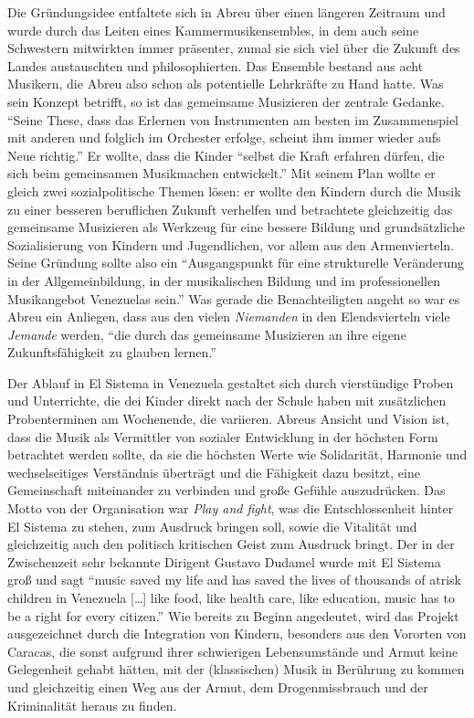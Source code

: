 Die Gründungsidee entfaltete sich in Abreu über einen längeren
Zeitraum und wurde durch das Leiten eines Kammermusikensembles, in dem auch
seine Schwestern mitwirkten immer präsenter, zumal sie sich viel über die
Zukunft des Landes austauschten und philosophierten. Das Ensemble bestand aus
acht Musikern, die Abreu also schon als potentielle Lehrkräfte zu Hand hatte.
\autocite[34]{kaufmann:el_sistema} Was sein Konzept betrifft, so ist das
gemeinsame Musizieren der zentrale Gedanke. \enquote{Seine These, dass das
Erlernen von Instrumenten am besten im Zusammenspiel mit anderen und folglich im
Orchester erfolge, scheint ihm immer wieder aufs Neue
richtig.}\autocite[34]{kaufmann:el_sistema} Er wollte, dass die Kinder
\enquote{selbst die Kraft erfahren dürfen, die sich beim gemeinsamen Musikmachen
entwickelt.}\autocite[34]{kaufmann:el_sistema} Mit seinem Plan wollte er gleich
zwei sozialpolitische Themen lösen: er wollte den Kindern durch die Musik zu
einer besseren beruflichen Zukunft verhelfen und betrachtete gleichzeitig das
gemeinsame Musizieren als Werkzeug für eine bessere Bildung und grundsätzliche
Sozialisierung von Kindern und Jugendlichen, vor allem aus den Armenvierteln.
Seine Gründung sollte also ein \enquote{Ausgangspunkt für eine strukturelle
Veränderung in der Allgemeinbildung, in der musikalischen Bildung und im
professionellen Musikangebot Venezuelas sein.}\autocite[38]{kaufmann:el_sistema}
Was gerade die Benachteiligten angeht so war es Abreu ein Anliegen, dass aus den
vielen \emph{Niemanden} in den Elendsvierteln viele \emph{Jemande} werden, \enquote{die durch
das gemeinsame Musizieren an ihre eigene Zukunftsfähigkeit zu glauben
lernen.}\autocite[39]{kaufmann:el_sistema}

Der Ablauf in El Sistema in Venezuela gestaltet sich durch vierstündige Proben
und Unterrichte, die dei Kinder direkt nach der Schule haben mit zusätzlichen
Probenterminen am Wochenende, die variieren. Abreus Ansicht und Vision ist, dass
die Musik als Vermittler von sozialer Entwicklung in der höchsten Form
betrachtet werden sollte, da sie die höchsten Werte wie Solidarität, Harmonie
und wechselseitiges Verständnis überträgt und die Fähigkeit dazu besitzt, eine
Gemeinschaft miteinander zu verbinden und große Gefühle auszudrücken. Das Motto
von der Organisation war \emph{Play and fight}, was die Entschlossenheit hinter
El Sistema zu stehen, zum Ausdruck bringen soll, sowie die Vitalität und
gleichzeitig auch den politisch kritischen Geist zum Ausdruck bringt. Der in der
Zwischenzeit sehr bekannte Dirigent Gustavo Dudamel wurde mit El Sistema groß
und sagt \enquote{music saved my life and has saved the lives of thousands of
atrisk children in Venezuela […] like food, like health care, like education,
music has to be a right for every citizen.}\autocite{wikipedia:el_sistema} Wie
bereits zu Beginn angedeutet, wird das Projekt ausgezeichnet durch die
Integration von Kindern, besonders aus den Vororten von Caracas, die sonst
aufgrund ihrer schwierigen Lebensumstände und Armut keine Gelegenheit gehabt
hätten, mit der (klassischen) Musik in Berührung zu kommen und gleichzeitig
einen Weg aus der Armut, dem Drogenmissbrauch und der Kriminalität heraus zu
finden.

